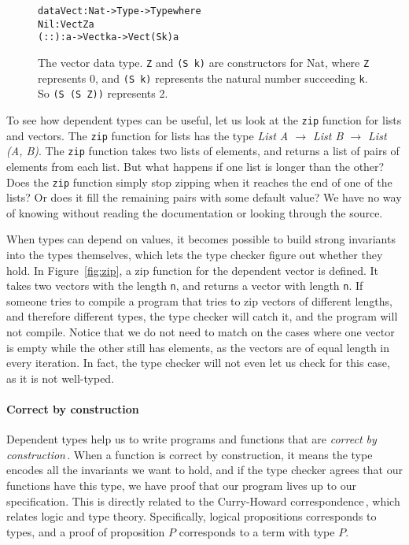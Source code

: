 \begin{figure}
\begin{alltt}
data Vect : Nat -> Type -> Type where
  Nil  : Vect Z a
  (::) : a -> Vect k a -> Vect (S k) a
\end{alltt}
\caption{The vector data type. \texttt{Z} and \texttt{(S k)} are constructors for Nat, where \texttt{Z} represents 0, and \texttt{(S k)} represents the natural number succeeding \texttt{k}. So \texttt{(S (S Z))} represents 2.}
\label{fig:vect}
\end{figure}

To see how dependent types can be useful, let us look at the \texttt{zip} function for lists and vectors. The \texttt{zip} function for lists has the type \textit{List A $\to$ List B $\to$ List (A, B)}. The \texttt{zip} function takes two lists of elements, and returns a list of pairs of elements from each list. But what happens if one list is longer than the other? Does the \texttt{zip} function simply stop zipping when it reaches the end of one of the lists? Or does it fill the remaining pairs with some default value? We have no way of knowing without reading the documentation or looking through the source.

When types can depend on values, it becomes possible to build strong invariants into the types themselves, which lets the type checker figure out whether they hold. In Figure~\ref{fig:zip}, a zip function for the dependent vector is defined. It takes two vectors with the length \texttt{n}, and returns a vector with length \texttt{n}. If someone tries to compile a program that tries to zip vectors of different lengths, and therefore different types, the type checker will catch it, and the program will not compile. Notice that we do not need to match on the cases where one vector is empty while the other still has elements, as the vectors are of equal length in every iteration. In fact, the type checker will not even let us check for this case, as it is not well-typed.

\paragraph{Correct by construction} Dependent types help us to write programs and functions that are \emph{correct by construction}\,\cite[p. 464]{Pierce:TypeSystems}. When a function is correct by construction, it means the type encodes all the invariants we want to hold, and if the type checker agrees that our functions have this type, we have proof that our program lives up to our specification. This is directly related to the Curry-Howard correspondence\,\cite{Pierce:TypeSystems}, which relates logic and type theory. Specifically, logical propositions corresponds to types, and a proof of proposition $P$ corresponds to a term with type $P$.

